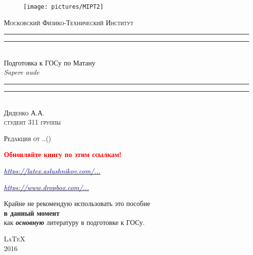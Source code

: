 \begin{titlepage}
\centering
\settowidth{\unitlength}{\LARGE\scshape Московский Физико-Технический Институт}

\begin{figure}[!h]
\center
\texttt{[image: pictures/MIPT2]}
\end{figure}
\vspace*{\baselineskip}
{\LARGE\scshape Московский Физико-Технический Институт}\\[\baselineskip]
\rule{\unitlength}{1.6pt}\vspace*{-\baselineskip}\vspace*{2pt}
\rule{\unitlength}{0.4pt}\\[1.8\baselineskip]
{\Huge Подготовка к ГОСу по Матану}\\[\baselineskip]
{\large \itshape Sapere aude}\\[0.7\baselineskip]
\rule{\unitlength}{0.4pt}\vspace*{-\baselineskip}\vspace{3.2pt}
\rule{\unitlength}{1.6pt}\\[\baselineskip]
{\Large\scshape Диденко А.А. \\ $ $\\студент 311 группы}\par
\vspace*{2\baselineskip}  




{\LARGE\scshape Редакция от \twodigit\day.\twodigit\month.\the\year \;(\currenttime)}\par %

\mbox{}

\textcolor{red}{\huge \textbf{Обновляйте книгу по этим ссылкам!}}

\mbox{}

\href{http://latex.aslushnikov.com/compile?git=https://github.com/DidenkoAndre/GOS_book&target=_main.tex}{\large \textcolor{darkblue}{\textit{https://latex.aslushnikov.com/...}}}

\mbox{}

\href{https://www.dropbox.com/sh/7e5mfj8q68o2ipp/AAD8XvpZhiJzFbEh_IeH305ia?dl=0&preview=GOSBook.pdf}{\large \textcolor{darkblue}{\textit{https://www.dropbox.com/...}}}

\mbox{}

Крайне не рекомендую использовать это пособие\\ {\textbf{в данный момент}} \\как \textit{\textbf{основную}} литературу в подготовке к ГОСу. \\

\mbox{}

\vfill
{\LARGE\scshape \LaTeX}\\[\baselineskip]
{\LARGE\scshape 2016}\par
\restoregeometry
\end{titlepage}
